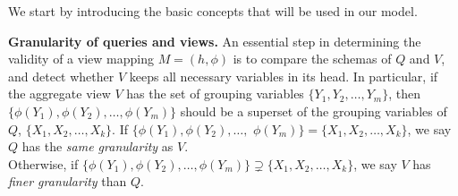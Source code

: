 

We start by introducing the basic concepts that will be used in our model.


\textbf{Granularity of queries and views.} An essential step in determining the validity of a view mapping $M=(h,\phi)$ is to compare the schemas of $Q$ and $V$, and detect whether $V$ keeps all necessary variables in its head. In particular, 
if the aggregate view $V$ has the set of grouping variables $\{Y_1, Y_2,\dots, Y_m\}$, then $\{\phi(Y_1), \phi(Y_2), \dots, \phi(Y_m)\}$ should be a superset of the grouping variables of $Q$, $\{X_1, X_2,\dots, X_k\}$. If $\{\phi(Y_1), \phi(Y_2), \dots,$ $\phi(Y_m)\} = \{X_1, X_2,\dots, X_k\}$, we say $Q$ has the {\em same granularity} as $V$. \\ 
Otherwise, if $\{\phi(Y_1), \phi(Y_2), \dots, \phi(Y_m)\} \supsetneq \{X_1, X_2,\dots, X_k\}$, we say $V$ has {\em finer granularity} than $Q$.



